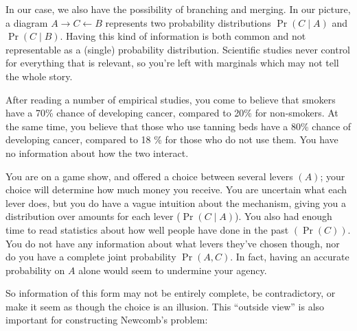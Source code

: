 \documentclass{article}
\begin{document}
	In our case, we also have the possibility of branching and merging. In our picture, a diagram $A \rightarrow C \leftarrow B$ represents two probability distributions $\Pr(C\mid A)$ and $\Pr(C \mid B)$.
	Having this kind of information is both common and not representable as a (single) probability distribution. Scientific studies never control for everything that is relevant, so you're left with marginals which may not tell the whole story.
	
	\begin{example}
		After reading a number of empirical studies, you come to believe that smokers have a 70\% chance of developing cancer, compared to 20\% for non-smokers. At the same time, you believe that those who use tanning beds have a 80\% chance of developing cancer, compared to 18 \% for those who do not use them. You have no information about how the two interact.
	\end{example}
	
	\begin{example}
		You are on a game show, and offered a choice between several levers $(A)$; your choice will determine how much money you receive. You are uncertain what each lever does, but you do have a vague intuition about the mechanism, giving you a distribution over amounts for each lever ($\Pr(C \mid A)$). You also had enough time to read statistics about how well people have done in the past $(\Pr(C))$. You do not have any information about what levers they've chosen though, nor do you have a complete joint probability $\Pr(A, C)$. In fact, having an accurate probability on $A$ alone would seem to undermine your agency.
	\end{example}
	
	
	So information of this form may not be entirely complete, be contradictory, or make it seem as though the choice is an illusion. This ``outside view'' is also important for constructing Newcomb's problem:
	
\end{document}
